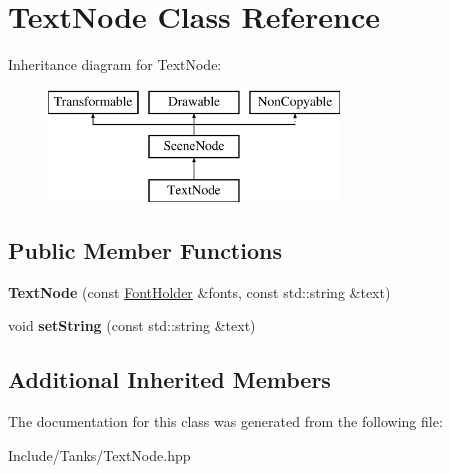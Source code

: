 \hypertarget{class_text_node}{}\section{Text\+Node Class Reference}
\label{class_text_node}
Inheritance diagram for Text\+Node\+:\begin{figure}[H]
\begin{center}
\leavevmode
\includegraphics[height=3.000000cm]{class_text_node}
\end{center}
\end{figure}
\subsection*{Public Member Functions}
\begin{DoxyCompactItemize}
\item 
\hypertarget{class_text_node_a6ac9f0e37c705f4afdeb2c1888ca4084}{}{\bfseries Text\+Node} (const \hyperlink{class_resource_holder}{Font\+Holder} \&fonts, const std\+::string \&text)\label{class_text_node_a6ac9f0e37c705f4afdeb2c1888ca4084}

\item 
\hypertarget{class_text_node_a51c396c803287f43ee640c6b6421a212}{}void {\bfseries set\+String} (const std\+::string \&text)\label{class_text_node_a51c396c803287f43ee640c6b6421a212}

\end{DoxyCompactItemize}
\subsection*{Additional Inherited Members}


The documentation for this class was generated from the following file\+:\begin{DoxyCompactItemize}
\item 
Include/\+Tanks/Text\+Node.\+hpp\end{DoxyCompactItemize}
